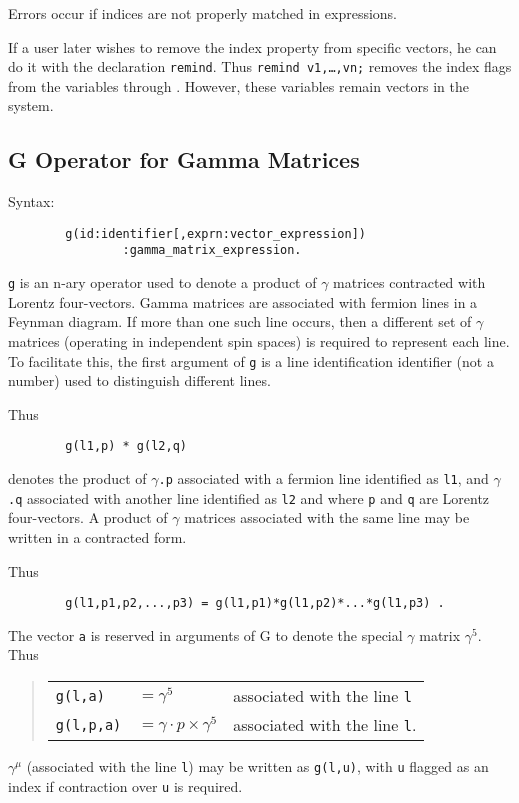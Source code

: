 Errors occur if indices are not properly matched in expressions.

\hypertarget{command:REMIND}{}
If a user later wishes to remove the index property from specific vectors,
he can do it with the declaration \texttt{remind}. Thus
\texttt{remind v1,\ldots{},vn;} removes the index flags from the variables 
through .  However, these variables remain vectors in the system.

\subsection{G Operator for Gamma Matrices}
\hypertarget{operator:G}{}

Syntax:
\begin{verbatim}
        g(id:identifier[,exprn:vector_expression])
                :gamma_matrix_expression.
\end{verbatim}
\texttt{g} is an n-ary operator used to denote a product of $\gamma$ matrices
contracted with Lorentz four-vectors. Gamma matrices are associated with
fermion lines in a Feynman diagram. If more than one such line occurs,
then a different set of $\gamma$ matrices (operating in independent spin
spaces) is required to represent each line. To facilitate this, the first
argument of \texttt{g} is a line identification identifier (not a number)
used to distinguish different lines.

Thus
\begin{verbatim}
        g(l1,p) * g(l2,q)
\end{verbatim}
denotes the product of \texttt{$\gamma$.p} associated with a fermion line
identified as \texttt{l1}, and \texttt{$\gamma$.q} associated with another line
identified as \texttt{l2} and where \texttt{p} and \texttt{q} are Lorentz
four-vectors.  A product of $\gamma$ matrices associated with the same
line may be written in a contracted form.

Thus
\begin{verbatim}
        g(l1,p1,p2,...,p3) = g(l1,p1)*g(l1,p2)*...*g(l1,p3) .
\end{verbatim}
The vector \texttt{a} is reserved in arguments of G to denote the special
$\gamma$ matrix $\gamma^{5}$. Thus
\begin{quote}
\begin{tabular}{lll}
 \texttt{g(l,a)} & $ = \gamma^{5}$ & associated with the line \texttt{l} \\[0.1in]
 \texttt{g(l,p,a)} & $ = \gamma\cdot p \times \gamma^{5}$ & 
           associated with the line \texttt{l}.
\end{tabular}
\end{quote}
$\gamma^{\mu}$ (associated with the line \texttt{l}) may be written as
\texttt{g(l,u)}, with \texttt{u} flagged as an index if contraction over \texttt{u}
is required.

